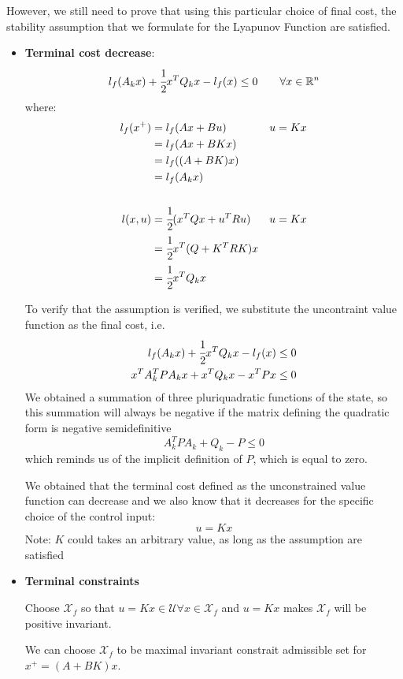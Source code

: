 However, we still need to prove that using this particular choice of final cost, the stability assumption that we formulate for the Lyapunov Function are satisfied.
\begin{itemize}
\item \textbf{Terminal cost decrease}:
\[l_f(A_k x) + \cfrac{1}{2}x^TQ_kx - l_f(x)\le0\qquad\forall x \in \mathbb{R}^n\]
where:
\begin{align*}
l_f(x^+) &= l_f(Ax + Bu)&u=Kx\\
&=  l_f(Ax + BKx)&\\
&= l_f((A+BK)x) &\\
&= l_f(A_kx)&\\
&&\\
l(x, u) &= \cfrac{1}{2}(x^TQx + u^TRu)&u = Kx\\
&= \cfrac{1}{2}x^T(Q+K^TRK)x\\
&= \cfrac{1}{2}x^TQ_kx
\end{align*}

To verify that the assumption is verified, we substitute the uncontraint value function as the final cost, i.e.
\begin{align*}
l_f(A_k x) + \cfrac{1}{2}x^TQ_kx - l_f(x)&\le0\\
x^TA_k^TPA_kx + x^TQ_kx - x^TPx &\le0
\end{align*}
We obtained a summation of three pluriquadratic functions of the state, so this summation will always be negative if the matrix defining the quadratic form is negative semidefinitive
\[A_k^TPA_k + Q_k - P \le 0\]
which reminds us of the implicit definition of $P$, which is equal to zero.

We obtained that the terminal cost defined as the unconstrained value function can decrease and we also know that it decreases for the specific choice of the control input:
\[u=Kx\]
Note: $K$ could takes an arbitrary value, as long as the assumption are satisfied
\item \textbf{Terminal constraints}

Choose $\mathcal{X}_f$ so that $u=Kx\in\mathcal{U} \forall x\in\mathcal{X}_f$ and $u=Kx$ makes $\mathcal{X}_f$ will be positive invariant.

We can choose $\mathcal{X}_f$ to be maximal invariant constrait admissible set for $x^+=(A+BK)x$.
\end{itemize}

